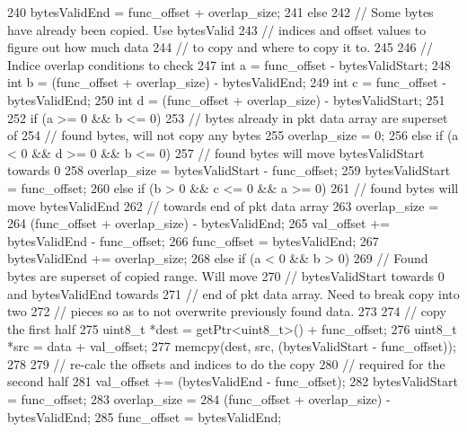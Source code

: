 \begin{DoxyCode}
{{{{240                 bytesValidEnd = func_offset + overlap_size;
241             } else {
242                 // Some bytes have already been copied. Use bytesValid
243                 // indices and offset values to figure out how much data
244                 // to copy and where to copy it to.
245 
246                 // Indice overlap conditions to check
247                 int a = func_offset - bytesValidStart;
248                 int b = (func_offset + overlap_size) - bytesValidEnd;
249                 int c = func_offset - bytesValidEnd;
250                 int d = (func_offset + overlap_size) - bytesValidStart;
251 
252                 if (a >= 0 && b <= 0) {
253                     // bytes already in pkt data array are superset of
254                     // found bytes, will not copy any bytes
255                     overlap_size = 0;
256                 } else if (a < 0 && d >= 0 && b <= 0) {
257                     // found bytes will move bytesValidStart towards 0
258                     overlap_size = bytesValidStart - func_offset;
259                     bytesValidStart = func_offset;
260                 } else if (b > 0 && c <= 0 && a >= 0) {
261                     // found bytes will move bytesValidEnd
262                     // towards end of pkt data array
263                     overlap_size =
264                         (func_offset + overlap_size) - bytesValidEnd;
265                     val_offset += bytesValidEnd - func_offset;
266                     func_offset = bytesValidEnd;
267                     bytesValidEnd += overlap_size;
268                 } else if (a < 0 && b > 0) {
269                     // Found bytes are superset of copied range. Will move
270                     // bytesValidStart towards 0 and bytesValidEnd towards
271                     // end of pkt data array.  Need to break copy into two
272                     // pieces so as to not overwrite previously found data.
273 
274                     // copy the first half
275                     uint8_t *dest = getPtr<uint8_t>() + func_offset;
276                     uint8_t *src = data + val_offset;
277                     memcpy(dest, src, (bytesValidStart - func_offset));
278 
279                     // re-calc the offsets and indices to do the copy
280                     // required for the second half
281                     val_offset += (bytesValidEnd - func_offset);
282                     bytesValidStart = func_offset;
283                     overlap_size =
284                         (func_offset + overlap_size) - bytesValidEnd;
285                     func_offset = bytesValidEnd;
}}}}}
\end{DoxyCode}
